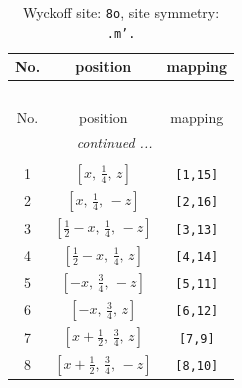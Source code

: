 \documentclass[fleqn,8pt]{jsarticle}
\begin{document}
\begin{longtable}{ccc}
\caption{Wyckoff site: {\tt 8o}, site symmetry: {\tt .m'.}}
 \\
 \hline \hline
No. & position & mapping \\ \hline \endfirsthead

\multicolumn{2}{l}{\tablename\ \thetable{}} \\
 \hline \hline
No. & position & mapping \\ \hline \endhead

 \hline \hline
\multicolumn{2}{r}{\footnotesize\it continued ...} \\ \endfoot

 \hline \hline
\multicolumn{2}{r}{} \\ \endlastfoot

1 & $\left[ x,\, \frac{1}{4},\, z \right]$ & {\tt [1,15]} \\ \hline
2 & $\left[ x,\, \frac{1}{4},\, - z \right]$ & {\tt [2,16]} \\ \hline
3 & $\left[ \frac{1}{2} - x,\, \frac{1}{4},\, - z \right]$ & {\tt [3,13]} \\ \hline
4 & $\left[ \frac{1}{2} - x,\, \frac{1}{4},\, z \right]$ & {\tt [4,14]} \\ \hline
5 & $\left[ - x,\, \frac{3}{4},\, - z \right]$ & {\tt [5,11]} \\ \hline
6 & $\left[ - x,\, \frac{3}{4},\, z \right]$ & {\tt [6,12]} \\ \hline
7 & $\left[ x + \frac{1}{2},\, \frac{3}{4},\, z \right]$ & {\tt [7,9]} \\ \hline
8 & $\left[ x + \frac{1}{2},\, \frac{3}{4},\, - z \right]$ & {\tt [8,10]} \\
\end{longtable}
\renewcommand{\arraystretch}{1.2}
\end{document}
